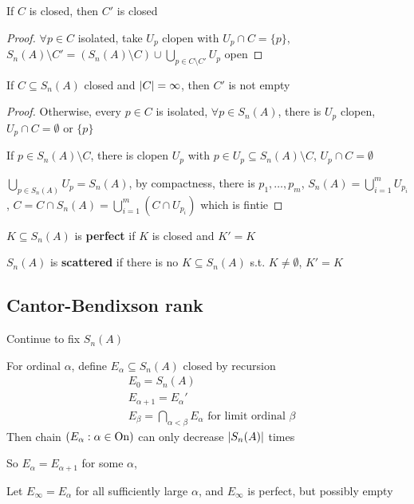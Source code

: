 \documentclass[11pt]{article}
\begin{document}
\begin{proposition}[]
If \(C\) is closed, then \(C'\) is closed
\end{proposition}

\begin{proof}
\(\forall p\in C\) isolated, take \(U_p\) clopen
with \(U_p\cap C=\{p\}\), \(S_n(A)\setminus C'=(S_n(A)\setminus C)\cup\bigcup_{p\in C\setminus C'}U_p\) open
\end{proof}

\begin{proposition}[]
If \(C\subseteq S_n(A)\) closed and \(\abs{C}=\infty\), then \(C'\) is not empty
\end{proposition}

\begin{proof}
Otherwise, every \(p\in C\) is isolated, \(\forall p\in S_n(A)\), there is \(U_p\) clopen, \(U_p\cap C=\emptyset\)
or \(\{p\}\)

If \(p\in S_n(A)\setminus C\), there is clopen \(U_p\) with \(p\in U_p\subseteq S_n(A)\setminus C\), \(U_p\cap C=\emptyset\)

\(\bigcup_{p\in S_n(A)}U_p=S_n(A)\), by compactness, there is \(p_1,\dots,p_m\), \(S_n(A)=\bigcup_{i=1}^mU_{p_i}\),
\(C=C\cap S_n(A)=\bigcup_{i=1}^m(C\cap U_{p_i})\) which is fintie
\end{proof}

\begin{definition}[]
\(K\subseteq S_n(A)\) is \textbf{perfect} if \(K\) is closed and \(K'=K\)

\(S_n(A)\) is \textbf{scattered} if there is no \(K\subseteq S_n(A)\) s.t. \(K\neq\emptyset\), \(K'=K\)
\end{definition}
\subsection{Cantor-Bendixson rank}
\label{sec:orged9f0e1}
Continue to fix \(S_n(A)\)

\begin{definition}[]
For ordinal \(\alpha\), define \(E_\alpha\subseteq S_n(A)\) closed by recursion
\begin{align*}
&E_0=S_n(A)\\
&E_{\alpha+1}=E_\alpha'\\
&E_\beta=\bigcap_{\alpha<\beta}E_\alpha\text{ for limit ordinal }\beta
\end{align*}
Then chain \((E_\alpha:\alpha\in\operatorname{On})\) can only decrease \(\abs{S_n(A)}\) times

So \(E_\alpha=E_{\alpha+1}\) for some \(\alpha\),

Let \(E_\infty=E_\alpha\) for all sufficiently large \(\alpha\), and \(E_\infty\) is perfect, but possibly empty
\end{definition}
\end{document}
